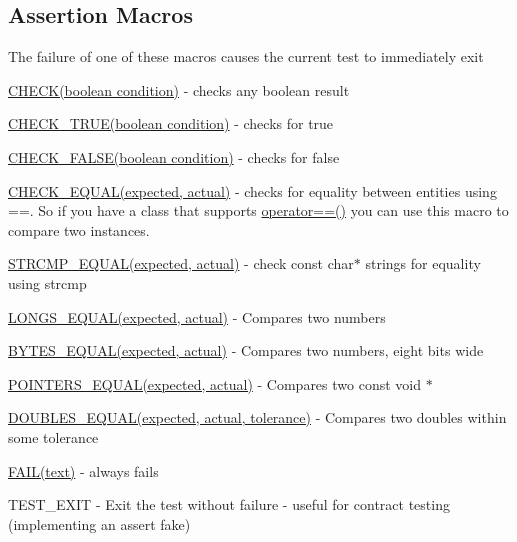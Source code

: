 \subsection*{Assertion Macros}

The failure of one of these macros causes the current test to immediately exit


\begin{DoxyItemize}
\item \hyperlink{_utest_macros_8h_a3e1cfef60e774a81f30eaddf26a3a274}{C\+H\+E\+C\+K(boolean condition)} -\/ checks any boolean result
\item \hyperlink{_utest_macros_8h_a92bdfb028cbcf7f3afb0c0646f75bd51}{C\+H\+E\+C\+K\+\_\+\+T\+R\+U\+E(boolean condition)} -\/ checks for true
\item \hyperlink{_utest_macros_8h_a09b0ff9e6719b11399ebfa571d397a04}{C\+H\+E\+C\+K\+\_\+\+F\+A\+L\+S\+E(boolean condition)} -\/ checks for false
\item \hyperlink{_utest_macros_8h_ad8fa79f5d491cc01af302832785e90fe}{C\+H\+E\+C\+K\+\_\+\+E\+Q\+U\+A\+L(expected, actual)} -\/ checks for equality between entities using ==. So if you have a class that supports \hyperlink{_simple_string_8cpp_a8bb3fb55107a2023bb828539fa6fe045}{operator==()} you can use this macro to compare two instances.
\item \hyperlink{_utest_macros_8h_ade1dda09c948fee9ceb853bc6dd5f3cb}{S\+T\+R\+C\+M\+P\+\_\+\+E\+Q\+U\+A\+L(expected, actual)} -\/ check const char$\ast$ strings for equality using strcmp
\item \hyperlink{_utest_macros_8h_a7921a0c4f152a7879e78fe6fc2905590}{L\+O\+N\+G\+S\+\_\+\+E\+Q\+U\+A\+L(expected, actual)} -\/ Compares two numbers
\item \hyperlink{_utest_macros_8h_ab5c5a937e779cb320e847355f40107b0}{B\+Y\+T\+E\+S\+\_\+\+E\+Q\+U\+A\+L(expected, actual)} -\/ Compares two numbers, eight bits wide
\item \hyperlink{_utest_macros_8h_a90ab7c47dd5332b46f916b8976c5a242}{P\+O\+I\+N\+T\+E\+R\+S\+\_\+\+E\+Q\+U\+A\+L(expected, actual)} -\/ Compares two const void $\ast$
\item \hyperlink{_utest_macros_8h_a64bb32929e2c1f2ed5521a27e775327e}{D\+O\+U\+B\+L\+E\+S\+\_\+\+E\+Q\+U\+A\+L(expected, actual, tolerance)} -\/ Compares two doubles within some tolerance
\item \hyperlink{_utest_macros_8h_a5b870ba9f143d10f76df4fa5aa01d58f}{F\+A\+I\+L(text)} -\/ always fails
\item T\+E\+S\+T\+\_\+\+E\+X\+IT -\/ Exit the test without failure -\/ useful for contract testing (implementing an assert fake)
\end{DoxyItemize}

